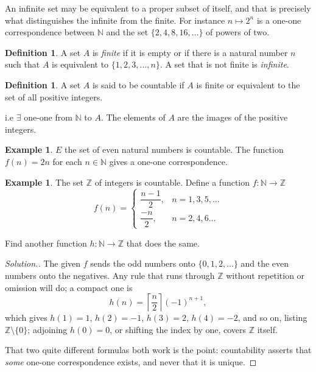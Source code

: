 \documentclass[11pt,a4paper]{article}
\theoremstyle{definition}
\newtheorem{defn}[thm]{Definition}
\newtheorem{exa}[thm]{Example}
\newenvironment{solution}
  {\renewcommand{\qedsymbol}{}\begin{proof}[\textit{Solution}.]}
  {\end{proof}}
\begin{document}
An infinite set may be equivalent to a proper subset of itself, and that is precisely what distinguishes the infinite from the finite. For instance $n\mapsto 2^n$ is a one-one correspondence between $\mathbb{N}$ and the set $\{2,4,8,16,\dots\}$ of powers of two.

\begin{defn}
A set $A$ is \emph{finite} if it is empty or if there is a natural number $n$ such that $A$ is equivalent to $\{1,2,3,\dots,n\}$. A set that is not finite is \emph{infinite}.
\end{defn}


\begin{defn}
A set $A$ is said to be countable if $A$ is finite or equivalent to the set of all positive integers.


i.e $\exists$ one-one from $\mathbb{N}$ to $A$. The elements of $A$ are the images of the positive integers.

\end{defn}


\begin{exa}
$E$ the set of even natural numbers is countable. The function $f(n)=2n$ for each $n\in \mathbb{N}$ gives a one-one correspondence.

\end{exa}


\begin{exa}
The set $\mathbb{Z}$ of integers is countable. Define a function $f:\mathbb{N}\rightarrow \mathbb{Z}$
\[f(n)=
\begin{cases}
\dfrac{n-1}{2}, &n=1,3,5,\dots\\
\dfrac{-n}{2},  &n=2,4,6\dots
\end{cases}
\]

Find another function $h:\mathbb{N}\rightarrow \mathbb{Z}$ that does the same.
\end{exa}

\begin{solution}
The given $f$ sends the odd numbers onto $\{0,1,2,\dots\}$ and the even numbers onto the negatives. Any rule that runs through $\mathbb{Z}$ without repetition or omission will do; a compact one is
$$h(n)=\left\lceil\frac{n}{2}\right\rceil(-1)^{n+1},$$
which gives $h(1)=1$, $h(2)=-1$, $h(3)=2$, $h(4)=-2$, and so on, listing $\mathbb{Z}\setminus\{0\}$; adjoining $h(0)=0$, or shifting the index by one, covers $\mathbb{Z}$ itself.

That two quite different formulas both work is the point: countability asserts that \emph{some} one-one correspondence exists, and never that it is unique.
\end{solution}
\end{document}
